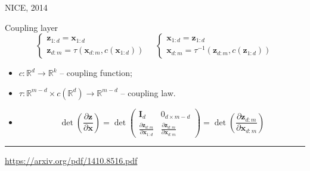 \documentclass{beamer}
\newcommand{\bx}{\mathbf{x}}
\newcommand{\bz}{\mathbf{z}}
\newcommand{\bI}{\mathbf{I}}
\begin{document}
\begin{frame}{NICE, 2014}
	\begin{block}{Coupling layer}
		\begin{equation*}
			\begin{cases} \bz_{1:d} = \bx_{1:d} \\ \bz_{d:m} = \tau (\bx_{d:m}, c(\bx_{1:d}))\end{cases} \quad 
			\begin{cases} \bx_{1:d} = \bz_{1:d} \\ \bx_{d:m} = \tau^{-1} (\bz_{d:m}, c(\bz_{1:d}))\end{cases}
		\end{equation*}
		\begin{itemize}
			\item $c: \mathbb{R}^d \rightarrow \mathbb{R}^{k}$ -- coupling function;
			\item $\tau : \mathbb{R}^{m - d} \times c(\mathbb{R}^d) \rightarrow \mathbb{R}^{m - d}$ -- coupling law.
			\item 
			\[
			\det \left( \frac{\partial \bz}{\partial \bx} \right) = \det 
			\begin{pmatrix}
				\bI_d & 0_{d \times m - d} \\
				\frac{\partial \bz_{d:m}}{\partial \bx_{1:d}} & \frac{\partial \bz_{d:m}}{\partial \bx_{d:m}}
			\end{pmatrix} = 
			\det \left( \frac{\partial \bz_{d:m}}{\partial \bx_{d:m}} \right)
			\]
		\end{itemize}
	\end{block}
	\vfill
	\hrule\medskip
	{\scriptsize \href{https://arxiv.org/pdf/1410.8516.pdf}{https://arxiv.org/pdf/1410.8516.pdf}} 
\end{frame}
\end{document}
